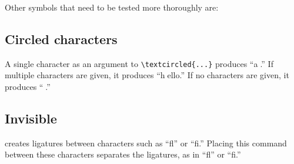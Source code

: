 \documentclass[11pt]{article}
\begin{document}
Other symbols that need to be tested more thoroughly are:

\subsection{Circled characters} A single character as an argument to \verb|\textcircled{...}| produces ``\textcircled{a}.'' If multiple characters are given, it produces ``\textcircled{hello}.'' If no characters are given, it produces ``\textcircled{}.''

    \subsection{Invisible}
\DiscoTeX{} creates ligatures between characters such as ``fl'' or ``fi.'' Placing this command between these characters separates the ligatures, as in ``f\textcompwordmark l'' or ``f\textcompwordmark i.''
\end{document}

